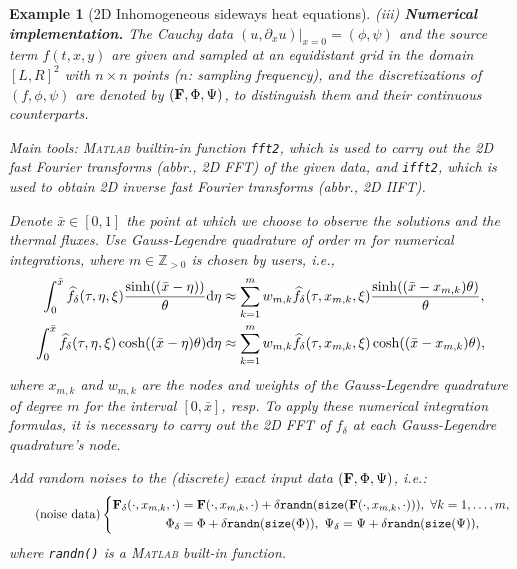 \documentclass[oneside]{article}
\numberwithin{equation}{section}
\newtheorem{example}{Example}[section]
\begin{document}
\begin{example}[2D Inhomogeneous sideways heat equations]
    \noindent(iii) \textbf{Numerical implementation.} The Cauchy data $(u,\partial_xu)|_{x=0} = (\phi,\psi)$ and the source term $f(t,x,y)$ are given and sampled at an equidistant grid in the domain $[L,R]^2$ with $n\times n$ points ($n$: sampling frequency), and the discretizations of $(f,\phi,\psi)$ are denoted by $({\bf F},\Phi,\Psi)$, to distinguish them and their continuous counterparts.
    
    Main tools: \textsc{Matlab} builtin-in function \verb|fft2|, which is used to carry out the 2D fast Fourier transforms (abbr., 2D FFT) of the given data, and \verb|ifft2|, which is used to obtain 2D inverse fast Fourier transforms (abbr., 2D IIFT). 
    
    Denote $\bar{x}\in[0,1]$ the point at which we choose to observe the solutions and the thermal fluxes. Use Gauss-Legendre quadrature of order $m$ for numerical integrations, where $m\in\mathbb{Z}_{> 0}$ is chosen by users, i.e.,
    \begin{align*}
        \int_0^{\bar{x}} \widehat{f_\delta}(\tau,\eta,\xi)\frac{\sinh((\bar{x} - \eta))}{\theta}{\rm d}\eta&\approx\sum_{k=1}^m w_{m,k}\widehat{f_\delta}(\tau,x_{m,k},\xi)\frac{\sinh((\bar{x} - x_{m,k})\theta)}{\theta},\\
        \int_0^{\bar{x}} \widehat{f_\delta}(\tau,\eta,\xi)\cosh((\bar{x} - \eta)\theta){\rm d}\eta&\approx\sum_{k=1}^m w_{m,k}\widehat{f_\delta}(\tau,x_{m,k},\xi)\cosh((\bar{x} - x_{m,k})\theta),
    \end{align*}
    where $x_{m,k}$ and $w_{m,k}$ are the nodes and weights of the Gauss-Legendre quadrature of degree $m$ for the interval $[0,\bar{x}]$, resp. To apply these numerical integration formulas, it is necessary to carry out the 2D FFT of $f_\delta$ at each Gauss-Legendre quadrature's node.
    
    Add random noises to the (discrete) exact input data $({\bf F},\Phi,\Psi)$, i.e.:
    \begin{equation}
        \label{noise data}
        \tag{noise data}
        \left\{\begin{split}
            {\bf F}_\delta(\cdot,x_{m,k},\cdot) &= {\bf F}(\cdot,x_{m,k},\cdot) + \delta\texttt{randn}(\texttt{size}({\bf F}(\cdot,x_{m,k},\cdot))),\ \forall k = 1,\ldots,m,\\
            \Phi_\delta &= \Phi + \delta\texttt{randn}(\texttt{size}(\Phi)),\ \Psi_\delta = \Psi + \delta\texttt{randn}(\texttt{size}(\Psi)),
        \end{split}\right.        
    \end{equation}
    where \verb|randn()| is a \textsc{Matlab} built-in function.
    

\end{example}
\end{document}
